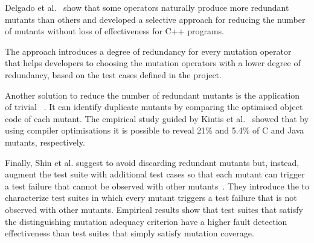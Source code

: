 Delgado et al.~\cite{delgado2017assessment} show that some operators naturally produce more redundant mutants than others and
developed a selective approach for reducing the number of mutants without loss of effectiveness for C++ programs. 

The approach introduces a degree of redundancy for every mutation operator that helps developers to choosing the mutation operators with a lower degree of redundancy, based on the test cases defined in the project.

Another solution to reduce the number of redundant mutants is the application of trivial ~\cite{papadakis2015trivial, kintis2017detecting,papadakis2019mutation}. 
It can identify duplicate mutants by comparing the optimised object code of each mutant. The empirical study guided by Kintis et al.~\cite{kintis2017detecting} showed that by using compiler optimisations it is possible to reveal 21\% and 5.4\% of C and Java mutants, respectively.


Finally, Shin et al. suggest to avoid discarding redundant mutants but, instead, augment the test suite with additional test cases so that 
each mutant can trigger a test failure that cannot be observed with other mutants~\cite{Shin:TSE:DCriterion:2018}. 
They introduce the  to characterize test suites in which every mutant triggers a test failure that is not observed with other mutants.
Empirical results show that test suites that satisfy the distinguishing mutation adequacy criterion have a higher
 fault detection effectiveness than test suites that simply satisfy mutation coverage.




